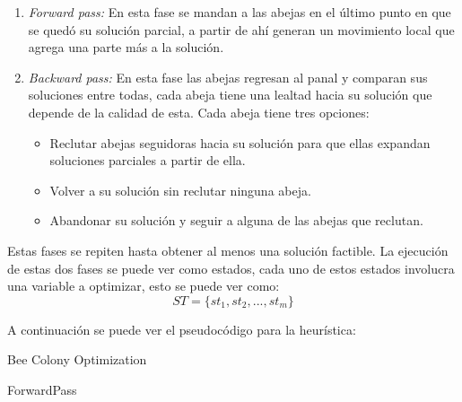 \documentclass[12pt]{article}
\begin{document}
  	\begin{enumerate}
  		\item \textit{Forward pass:} En esta fase se mandan a las abejas en el último
  		punto en que se quedó su solución parcial, a partir de ahí generan un 
  		movimiento local que agrega una parte más a la solución.
  		\item \textit{Backward pass:} En esta fase las abejas regresan al panal y 
  		comparan sus soluciones entre todas, cada abeja tiene una lealtad hacia su 
  		solución que depende de la calidad de esta. Cada abeja tiene tres opciones:
  		\begin{itemize}
  			\item Reclutar abejas seguidoras hacia su solución para que ellas expandan 
  			soluciones parciales a partir de ella.
  			\item Volver a su solución sin reclutar ninguna abeja.
  			\item Abandonar su solución y seguir a alguna de las abejas que reclutan.
  		\end{itemize}
  	\end{enumerate}
  	
  	Estas fases se repiten hasta obtener al menos una solución factible. La 
  	ejecución de estas dos fases se puede ver como estados, cada uno de estos
  	estados involucra una variable a optimizar, esto se puede ver como:
  	\[ST=\{st_1,st_2,...,st_m\}\]
  		
  	A continuación se puede ver el pseudocódigo para la heurística:
  		
  	\begin{algorithm}[H]
  		\SetAlgoLined
  		\caption{Bee Colony Optimization}
  	\end{algorithm}
  
  	\begin{algorithm}[H]
  		\SetAlgoLined
  		\caption{ForwardPass}
  	\end{algorithm}
  
\end{document}
